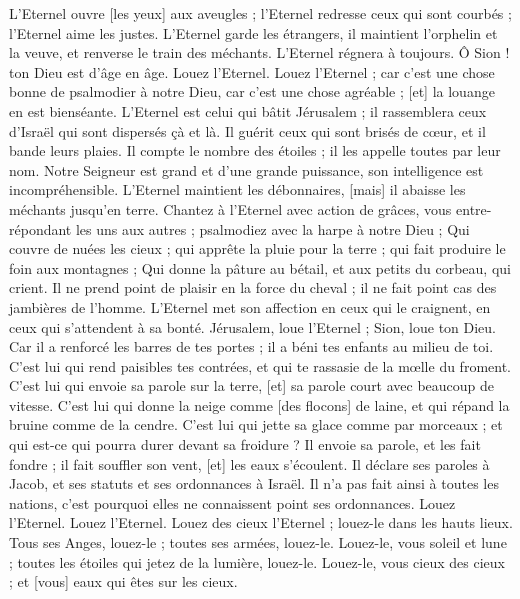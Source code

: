 \begin{multicols}{2}
L'Eternel ouvre [les yeux] aux aveugles ; l'Eternel redresse ceux qui sont courbés ; l'Eternel aime les justes.
L'Eternel garde les étrangers, il maintient l'orphelin et la veuve, et renverse le train des méchants.
L'Eternel régnera à toujours. Ô Sion ! ton Dieu est d'âge en âge. Louez l'Eternel.
\VerseOne{}Louez l'Eternel ; car c'est une chose bonne de psalmodier à notre Dieu, car c'est une chose agréable ; [et] la louange en est bienséante.
L'Eternel est celui qui bâtit Jérusalem ; il rassemblera ceux d'Israël qui sont dispersés çà et là.
Il guérit ceux qui sont brisés de cœur, et il bande leurs plaies.
Il compte le nombre des étoiles ; il les appelle toutes par leur nom.
Notre Seigneur est grand et d'une grande puissance, son intelligence est incompréhensible.
L'Eternel maintient les débonnaires, [mais] il abaisse les méchants jusqu’en terre.
Chantez à l'Eternel avec action de grâces, vous entre-répondant les uns aux autres ; psalmodiez avec la harpe à notre Dieu ;
Qui couvre de nuées les cieux ; qui apprête la pluie pour la terre ; qui fait produire le foin aux montagnes ;
Qui donne la pâture au bétail, et aux petits du corbeau, qui crient.
Il ne prend point de plaisir en la force du cheval ; il ne fait point cas des jambières de l'homme.
L'Eternel met son affection en ceux qui le craignent, en ceux qui s'attendent à sa bonté.
Jérusalem, loue l'Eternel ; Sion, loue ton Dieu.
Car il a renforcé les barres de tes portes ; il a béni tes enfants au milieu de toi.
C'est lui qui rend paisibles tes contrées, et qui te rassasie de la mœlle du froment.
C'est lui qui envoie sa parole sur la terre, [et] sa parole court avec beaucoup de vitesse.
C'est lui qui donne la neige comme [des flocons] de laine, et qui répand la bruine comme de la cendre.
C'est lui qui jette sa glace comme par morceaux ; et qui est-ce qui pourra durer devant sa froidure ?
Il envoie sa parole, et les fait fondre ; il fait souffler son vent, [et] les eaux s'écoulent.
Il déclare ses paroles à Jacob, et ses statuts et ses ordonnances à Israël.
Il n'a pas fait ainsi à toutes les nations, c'est pourquoi elles ne connaissent point ses ordonnances. Louez l'Eternel.
\VerseOne{}Louez l'Eternel. Louez des cieux l'Eternel ; louez-le dans les hauts lieux.
Tous ses Anges, louez-le ; toutes ses armées, louez-le.
Louez-le, vous soleil et lune ; toutes les étoiles qui jetez de la lumière, louez-le.
Louez-le, vous cieux des cieux ; et [vous] eaux qui êtes sur les cieux.

\end{multicols}
